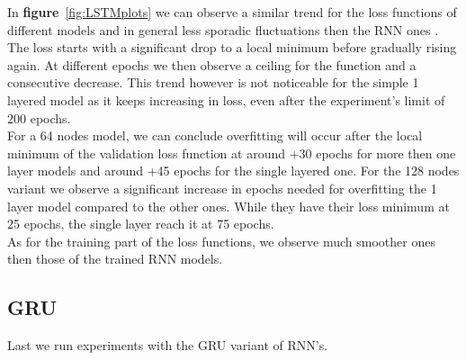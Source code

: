 \documentclass[11pt]
{article}
\begin{document}
In \textbf{figure}~\ref{fig:LSTMplots} we can observe a similar trend for the loss functions of different models and in general less sporadic fluctuations then the RNN ones . The loss starts with a significant drop to a local minimum before gradually rising again. At different epochs we then observe a ceiling for the function and a consecutive decrease. This trend however is not noticeable for the simple 1 layered model as it keeps increasing in loss, even after the experiment's limit of  200 epochs.
\\
For a 64 nodes model, we can conclude overfitting will occur after the local minimum of the validation loss function at around +30 epochs for more then one layer models and around +45  epochs for the single layered one. For the 128 nodes variant we observe a significant increase in epochs needed for overfitting the 1 layer model compared to the other ones. While they have their loss minimum at 25 epochs, the single layer reach it at 75 epochs.
\\
As for the training part of the loss functions, we observe much smoother ones then those of the trained RNN models.

\subsection{GRU}
Last we run experiments with the GRU variant of RNN's. 
\end{document}
